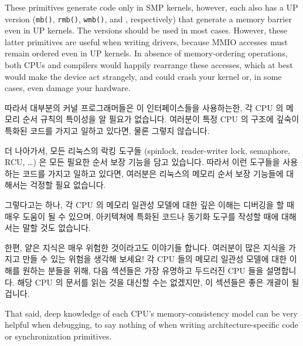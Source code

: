 These primitives generate code only in SMP kernels, however, each
also has a UP version ({\tt mb()}, {\tt rmb()}, {\tt wmb()},
and ,
respectively) that generate a memory barrier even in UP kernels. The 
versions should be used in most cases. However, these latter primitives
are useful when writing drivers, because MMIO accesses must remain
ordered even in UP kernels. In absence of memory-ordering operations,
both CPUs and compilers would happily rearrange these accesses, which at
best would make the device act strangely, and could crash your kernel or,
in some cases, even damage your hardware.
\fi

따라서 대부분의 커널 프로그래머들은 이 인터페이스들을 사용하는한, 각 CPU 의
메모리 순서 규칙의 특이성을 알 필요가 없습니다.
여러분이 특정 CPU 의 구조에 깊숙이 특화된 코드를 가지고 일하고 있다면, 물론
그렇지 않습니다.

더 나아가서, 모든 리눅스의 락킹 도구들 (spinlock, reader-writer lock,
semaphore, RCU, \ldots) 은 모든 필요한 순서 보장 기능을 담고 있습니다.
따라서 이런 도구들을 사용하는 코드를 가지고 일하고 있다면, 여러분은 리눅스의
메모리 순서 보장 기능들에 대해서는 걱정할 필요 없습니다.

그렇다고는 하나, 각 CPU 의 메모리 일관성 모델에 대한 깊은 이해는 디버깅을 할 때
매우 도움이 될 수 있으며, 아키텍쳐에 특화된 코드나 동기화 도구를 작성할 때에
대해서는 말할 것도 없습니다.

한편, 얕은 지식은 매우 위험한 것이라고도 이야기들 합니다.
여러분이 많은 지식을 가지고 만들 수 있는 위험을 생각해 보세요!
각 CPU 들의 메모리 일관성 모델에 대한 이해를 원하는 분들을 위해, 다음 섹션들은
가장 유명하고 두드러진 CPU 들을 설명합니다.
해당 CPU 의 문서를 읽는 것을 대신할 수는 없겠지만, 이 섹션들은 좋은 개괄이 될
겁니다.
\iffalse

That said, deep knowledge of each CPU's memory-consistency model
can be very helpful when debugging, to say nothing of when writing
architecture-specific code or synchronization primitives.

